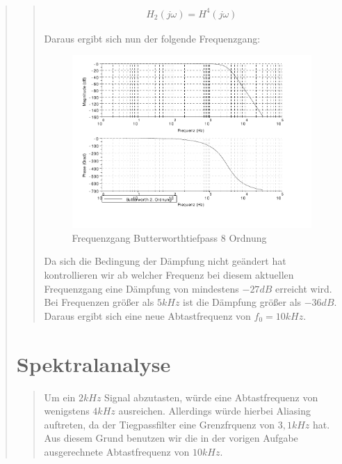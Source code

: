 \begin{quote}
\begin{quote}
        \begin{equation*}
        	\begin{split}
        		H_2(j\omega) = H^4 (j\omega)
        	\end{split}
        \end{equation*}
        
        Daraus ergibt sich nun der folgende Frequenzgang:
        
        \begin{figure}[H]
			\centering
				\includegraphics[scale=1]{Frequenzgang8Ordnung}
				   \caption{Frequenzgang Butterworthtiefpass 8 Ordnung}
		\end{figure}
		\vspace{1em}
	 	
	 	Da sich die Bedingung der Dämpfung nicht geändert hat kontrollieren wir ab welcher Frequenz bei diesem aktuellen
	 	Frequenzgang eine Dämpfung von mindestens $-27 dB$ erreicht wird.\\
	 	Bei Frequenzen größer als $5kHz$ ist die Dämpfung größer als $-36 dB$. Daraus ergibt sich eine neue Abtastfrequenz
	 	von $f_0 = 10kHz$.
    \end{quote}
    
    \section{Spektralanalyse}
    \begin{quote}
    	Um ein $2kHz$ Signal abzutasten, würde eine Abtastfrequenz von wenigstens $4 kHz$ ausreichen. Allerdings würde
    	hierbei Aliasing auftreten, da der Tiegpassfilter eine Grenzfrquenz von $3,1kHz$ hat.\\
    	Aus diesem Grund benutzen wir die in der vorigen Aufgabe ausgerechnete Abtastfrequenz von $10kHz$.
    \end{quote}
\end{quote}

